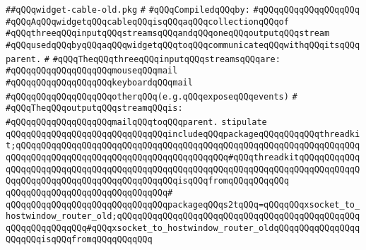 \label{src/lib/x-kit/xclient/src/window/widget-cable-old.pkg}
\verb|##qQQqwidget-cable-old.pkg|\newline
\verb|#|\newline
\newline
\verb|#qQQqCompiledqQQqby:|\newline
\verb|#qQQqqQQqqQQqqQQqqQQq|\newline
\newline
\newline
\newline
\verb|#qQQqAqQQqwidgetqQQqcableqQQqisqQQqaqQQqcollectionqQQqof|\newline
\verb|#qQQqthreeqQQqinputqQQqstreamsqQQqandqQQqoneqQQqoutputqQQqstream|\newline
\verb|#qQQqusedqQQqbyqQQqaqQQqwidgetqQQqtoqQQqcommunicateqQQqwithqQQqitsqQQqparent.|\newline
\verb|#|\newline
\verb|#qQQqTheqQQqthreeqQQqinputqQQqstreamsqQQqare:|\newline
\verb|#qQQqqQQqqQQqqQQqqQQqmouseqQQqmail|\newline
\verb|#qQQqqQQqqQQqqQQqqQQqkeyboardqQQqmail|\newline
\verb|#qQQqqQQqqQQqqQQqqQQqotherqQQq(e.g.qQQqexposeqQQqevents)|\newline
\verb|#|\newline
\verb|#qQQqTheqQQqoutputqQQqstreamqQQqis:|\newline
\verb|#qQQqqQQqqQQqqQQqqQQqmailqQQqtoqQQqparent.|\newline
\newline
\newline
\verb|stipulate|\newline
\verb|qQQqqQQqqQQqqQQqqQQqqQQqqQQqqQQqincludeqQQqpackageqQQqqQQqqQQqthreadkit;qQQqqQQqqQQqqQQqqQQqqQQqqQQqqQQqqQQqqQQqqQQqqQQqqQQqqQQqqQQqqQQqqQQqqQQqqQQqqQQqqQQqqQQqqQQqqQQqqQQqqQQqqQQqqQQq#qQQqthreadkitqQQqqQQqqQQqqQQqqQQqqQQqqQQqqQQqqQQqqQQqqQQqqQQqqQQqqQQqqQQqqQQqqQQqqQQqqQQqqQQqqQQqqQQqqQQqqQQqqQQqqQQqqQQqqQQqqQQqisqQQqfromqQQqqQQqqQQq|\newline
\verb|qQQqqQQqqQQqqQQqqQQqqQQqqQQqqQQq#|\newline
\verb|qQQqqQQqqQQqqQQqqQQqqQQqqQQqqQQqpackageqQQqs2tqQQq=qQQqqQQqxsocket_to_hostwindow_router_old;qQQqqQQqqQQqqQQqqQQqqQQqqQQqqQQqqQQqqQQqqQQqqQQqqQQqqQQqqQQqqQQq#qQQqxsocket_to_hostwindow_router_oldqQQqqQQqqQQqqQQqqQQqqQQqisqQQqfromqQQqqQQqqQQq|\newline
